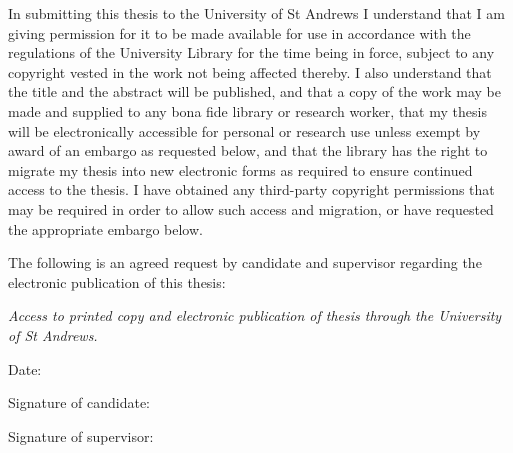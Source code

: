%
%


\begin{permission}
In submitting this thesis to the University of St Andrews I understand that I am giving permission for it to be made available for use in accordance with the regulations of the University Library for the time being in force, subject to any copyright vested in the work not being affected thereby. I also understand that the title and the abstract will be published, and that a copy of the work may be made and supplied to any bona fide library or research worker, that my thesis will be electronically accessible for personal or research use unless exempt by award of an embargo as requested below, and that the library has the right to migrate my thesis into new electronic forms as required to ensure continued access to the thesis. I have obtained any third-party copyright permissions that may be required in order to allow such access and migration, or have requested the appropriate embargo below.

The following is an agreed request by candidate and supervisor regarding the electronic publication of this thesis:

\begin{indentpara}
\emph{Access to printed copy and electronic publication of thesis through the University of St Andrews.}
\end{indentpara}

\vspace{24pt}

Date:
\vspace{16pt}

Signature of candidate:
\vspace{48pt}

Signature of supervisor:
\end{permission}